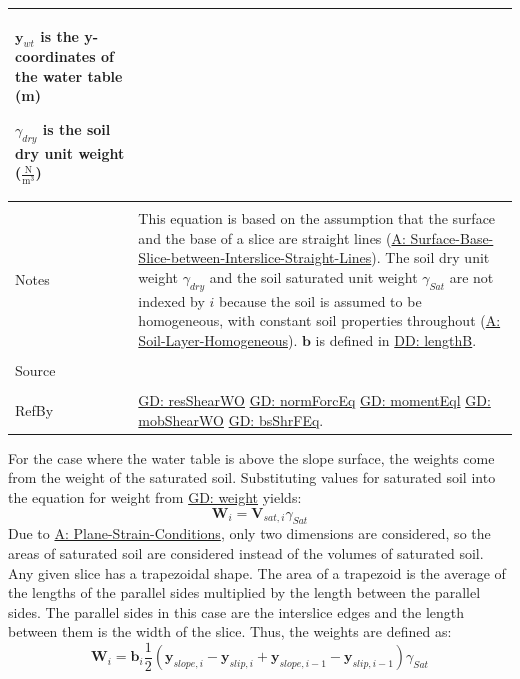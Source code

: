 \documentclass[12pt]{article}
\begin{document}
\begin{minipage}{\textwidth}
\begin{tabular}{p{} p{}}
\begin{symbDescription}
              \item{${\mathbf{y}_{wt}}$ is the y-coordinates of the water table (m)}
              \item{${γ_{dry}}$ is the soil dry unit weight ($\frac{\text{N}}{\text{m}^{3}}$)}
              \end{symbDescription}
\\ \midrule \\
Notes & This equation is based on the assumption that the surface and the base of a slice are straight lines (\hyperref[assumpSBSBISL]{A: Surface-Base-Slice-between-Interslice-Straight-Lines}). The soil dry unit weight ${γ_{dry}}$ and the soil saturated unit weight ${γ_{Sat}}$ are not indexed by $i$ because the soil is assumed to be homogeneous, with constant soil properties throughout (\hyperref[assumpSLH]{A: Soil-Layer-Homogeneous}). $\mathbf{b}$ is defined in \hyperref[DD:lengthB]{DD: lengthB}.
\\ \midrule \\
Source & \cite{fredlund1977}
\\ \midrule \\
RefBy & \hyperref[GD:resShearWO]{GD: resShearWO} \hyperref[GD:normForcEq]{GD: normForcEq} \hyperref[GD:momentEql]{GD: momentEql} \hyperref[GD:mobShearWO]{GD: mobShearWO} \hyperref[GD:bsShrFEq]{GD: bsShrFEq}.
\\ \bottomrule \end{tabular}
\end{minipage}
For the case where the water table is above the slope surface, the weights come from the weight of the saturated soil. Substituting values for saturated soil into the equation for weight from \hyperref[GD:weight]{GD: weight} yields:
\begin{displaymath}
{\mathbf{W}}_{i}={\mathbf{V}_{sat,i}} {γ_{Sat}}
\end{displaymath}
Due to \hyperref[assumpPSC]{A: Plane-Strain-Conditions}, only two dimensions are considered, so the areas of saturated soil are considered instead of the volumes of saturated soil. Any given slice has a trapezoidal shape. The area of a trapezoid is the average of the lengths of the parallel sides multiplied by the length between the parallel sides. The parallel sides in this case are the interslice edges and the length between them is the width of the slice. Thus, the weights are defined as:
\begin{displaymath}
{\mathbf{W}}_{i}={\mathbf{b}}_{i} \frac{1}{2} \left({\mathbf{y}_{slope,i}}-{\mathbf{y}_{slip,i}}+{\mathbf{y}_{slope,i-1}}-{\mathbf{y}_{slip,i-1}}\right) {γ_{Sat}}
\end{displaymath}
\end{document}
